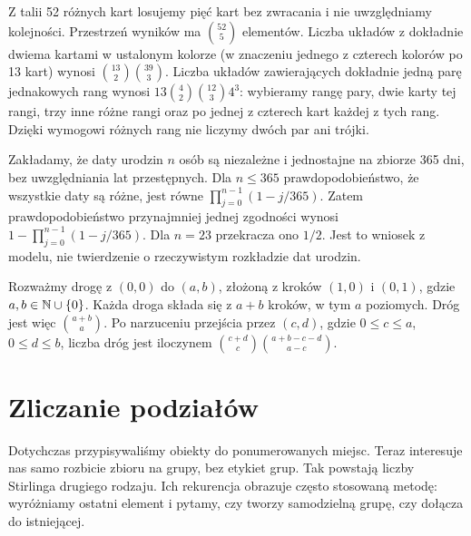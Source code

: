 \begin{przyklad}
Z talii 52 różnych kart losujemy pięć kart bez zwracania i nie
uwzględniamy kolejności. Przestrzeń wyników ma $\binom{52}5$ elementów.
Liczba układów z dokładnie dwiema kartami w ustalonym kolorze
(w znaczeniu jednego z czterech kolorów po 13 kart) wynosi
$\binom{13}2\binom{39}3$. Liczba układów zawierających dokładnie
jedną parę jednakowych rang wynosi
$13\binom42\binom{12}3 4^3$: wybieramy rangę pary,
dwie karty tej rangi, trzy inne różne rangi oraz po jednej z czterech
kart każdej z tych rang. Dzięki wymogowi różnych rang nie liczymy
dwóch par ani trójki.
\end{przyklad}

\begin{przyklad}
Zakładamy, że daty urodzin $n$ osób są niezależne i jednostajne na
zbiorze 365 dni, bez uwzględniania lat przestępnych. Dla $n\leq365$
prawdopodobieństwo, że wszystkie daty są różne, jest równe
$\prod_{j=0}^{n-1}(1-j/365)$. Zatem prawdopodobieństwo przynajmniej
jednej zgodności wynosi
$1-\prod_{j=0}^{n-1}(1-j/365)$.
Dla $n=23$ przekracza ono $1/2$. Jest to wniosek z modelu,
nie twierdzenie o rzeczywistym rozkładzie dat urodzin.
\end{przyklad}

\begin{przyklad}
Rozważmy drogę z $(0,0)$ do $(a,b)$, złożoną z kroków $(1,0)$ i $(0,1)$,
gdzie $a,b\in\mathbb{N}\cup\{0\}$. Każda droga składa się z $a+b$ kroków,
w tym $a$ poziomych. Dróg jest więc $\binom{a+b}{a}$.
Po narzuceniu przejścia przez $(c,d)$, gdzie $0\leq c\leq a$,
$0\leq d\leq b$, liczba dróg jest iloczynem
$\binom{c+d}c\binom{a+b-c-d}{a-c}$.
\end{przyklad}

\section{Zliczanie podziałów}
Dotychczas przypisywaliśmy obiekty do ponumerowanych miejsc.
Teraz interesuje nas samo rozbicie zbioru na grupy, bez etykiet
grup. Tak powstają liczby Stirlinga drugiego rodzaju. Ich
rekurencja obrazuje często stosowaną metodę: wyróżniamy ostatni
element i pytamy, czy tworzy samodzielną grupę, czy dołącza
do istniejącej.

